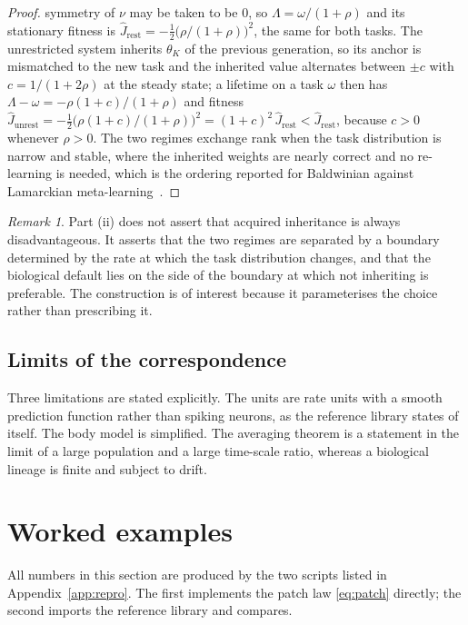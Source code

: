 \documentclass[11pt]{article}
\theoremstyle{definition}
\theoremstyle{remark}
\newtheorem{remark}[theorem]{Remark}
\begin{document}
\begin{proof}
symmetry of $\nu$ may be taken to be $0$, so $\Lambda=\omega/(1+\rho)$ and its stationary fitness is
$\hat J_{\text{rest}}=-\tfrac12\big(\rho/(1+\rho)\big)^2$, the same for both tasks. The unrestricted
system inherits $\theta_K$ of the previous generation, so its anchor is mismatched to the new task and
the inherited value alternates between $\pm c$ with $c=1/(1+2\rho)$ at the steady state; a lifetime on a
task $\omega$ then has $\Lambda-\omega=-\rho(1+c)/(1+\rho)$ and fitness
$\hat J_{\text{unrest}}=-\tfrac12\big(\rho(1+c)/(1+\rho)\big)^2=(1+c)^2\,\hat J_{\text{rest}}<
\hat J_{\text{rest}}$, because $c>0$ whenever $\rho>0$. The two regimes exchange rank when the task
distribution is narrow and stable, where the inherited weights are nearly correct and no re-learning is
needed, which is the ordering reported for Baldwinian against Lamarckian
meta-learning~\cite{baldwin}.
\end{proof}

\begin{remark}
Part (ii) does not assert that acquired inheritance is always disadvantageous. It asserts that the two
regimes are separated by a boundary determined by the rate at which the task distribution changes, and
that the biological default lies on the side of the boundary at which not inheriting is preferable.
The construction is of interest because it parameterises the choice rather than prescribing it.
\end{remark}

\subsection{Limits of the correspondence}
Three limitations are stated explicitly. The units are rate units with a smooth prediction function
rather than spiking neurons, as the reference library states of itself. The body model is simplified.
The averaging theorem is a statement in the limit of a large population and a large time-scale ratio,
whereas a biological lineage is finite and subject to drift.

\section{Worked examples}
\label{sec:examples}

All numbers in this section are produced by the two scripts listed in Appendix~\ref{app:repro}. The
first implements the patch law \eqref{eq:patch} directly; the second imports the reference library and
compares.
\end{document}
